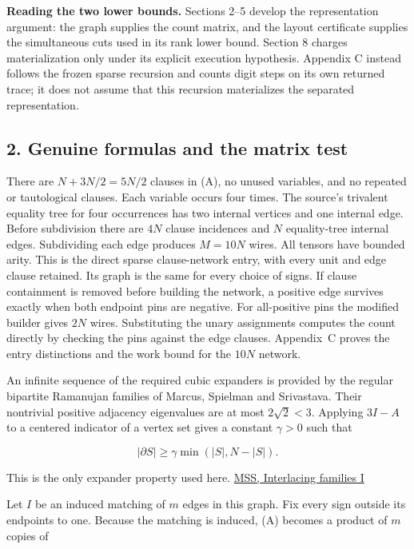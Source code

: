 \documentclass[
  11pt,
]{article}
\begin{document}
\textbf{Reading the two lower bounds.} Sections 2--5 develop the
representation argument: the graph supplies the count matrix, and
the layout certificate supplies the simultaneous cuts used in its
rank lower bound. Section 8 charges materialization only under its
explicit execution hypothesis. Appendix C instead follows the frozen
sparse recursion and counts digit steps on its own returned trace;
it does not assume that this recursion materializes the separated
representation.

\subsection{2. Genuine formulas and the matrix
test}\label{genuine-formulas-and-the-matrix-test}

There are \(N+3N/2=5N/2\) clauses in (A), no unused variables, and no
repeated or tautological clauses. Each variable occurs four times. The
source's trivalent equality tree for four occurrences has two internal
vertices and one internal edge. Before subdivision there are \(4N\)
clause incidences and \(N\) equality-tree internal edges. Subdividing
each edge produces \(M=10N\) wires. All tensors have bounded arity.
This is the direct sparse clause-network entry, with every unit and
edge clause retained. Its graph is the same for every choice of signs.
If clause containment is removed before building the network, a
positive edge survives exactly when both endpoint pins are negative.
For all-positive pins the modified builder gives \(2N\) wires.
Substituting the unary assignments computes the count directly by
checking the pins against the edge clauses. Appendix~C proves the
entry distinctions and the work bound for the \(10N\) network.

An infinite sequence of the required cubic expanders is provided by the
regular bipartite Ramanujan families of Marcus, Spielman and Srivastava.
Their nontrivial positive adjacency eigenvalues are at most
\(2\sqrt2<3\). Applying \(3I-A\) to a centered indicator of a vertex set
gives a constant \(\gamma>0\) such that

\[
|\partial S|\ge\gamma\min(|S|,N-|S|).
\]

This is the only expander property used here.
\href{https://annals.math.princeton.edu/2015/182-1/p07}{MSS, Interlacing
families I}

Let \(I\) be an induced matching of \(m\) edges in this graph. Fix every
sign outside its endpoints to one. Because the matching is induced, (A)
becomes a product of \(m\) copies of
\end{document}

